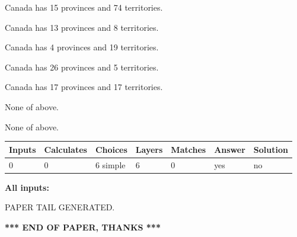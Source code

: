 \documentclass[12pt]{article}
\begin{document}
 
Canada has  15 provinces and  74 territories.
 
 
Canada has  13 provinces and  8 territories.
 
 
Canada has   4 provinces and  19 territories.
 
 
Canada has  26 provinces and  5 territories.
 
 
Canada has  17 provinces and  17 territories.
 
 
 None of above.
 
 
\noindent{}
 
 
 None of above.
 
 
\noindent{}
 
 
   
   
   
   
\noindent\begin{tabular}{|l|l|l|l|l|l|l|}
 \hline
Inputs & Calculates & Choices & Layers & Matches & Answer & Solution \\ \hline
 0  & 
 0  & 
 6
  simple  
  & 
 6  & 
 0  & 
  yes & 
  no 
  \\ \hline
 \end{tabular}
   
   
   
   
\noindent{}
   
   
   
   
\noindent\vspace{0.1in}\hspace{-0.08in} {\textbf{\Large{All inputs: }}}
   
   
   
   
   
   
 \vspace{0.2in}
 
   
   
\vspace{2.0in} PAPER TAIL GENERATED.
   
   
   
   
\vspace{1.0in} 
{\textbf{\large{ *** END OF PAPER, THANKS *** }}} 
   
\end{document}
